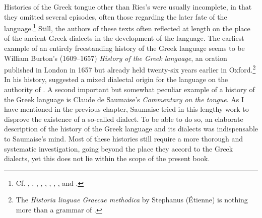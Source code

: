 Histories of the Greek tongue other than Ries’s were usually incomplete, in that they omitted several episodes, often those regarding the later fate of the language.\footnote{Cf. \citet[267--464]{Saumaise1643a}, \citet{Burton1657}, \citet{Lagerloof1685}, \citet{Rodigast1685}, \citet{Eling1691}, \citet{Florinus1707}, \citet{Reinhard1724}, \citet{Munthe1748}, and \citet{Harles1778}.} Still, the authors of these texts often reflected at length on the place of the ancient Greek dialects in the development of the language. The earliest example of an entirely freestanding history of the Greek language seems to be William Burton’s (1609–1657) \textit{History of the Greek language}, an oration published in London in 1657 but already held twenty-six years earlier in Oxford.\footnote{The \textit{Historia linguae Graecae methodica} by Stephanus (Étienne) \citet{Simon1615} is nothing more than a grammar of .} In his history, \citet[27]{Burton1657} suggested a mixed dialectal origin for the  language on the authority of . A second important but somewhat peculiar example of a history of the Greek language is Claude de Saumaise’s \textit{Commentary on the  tongue}. As I have mentioned in the previous chapter, Saumaise tried in this lengthy work to disprove the existence of a so-called  dialect. To be able to do so, an elaborate description of the history of the Greek language and its dialects was indispensable to Saumaise’s mind. Most of these histories still require a more thorough and systematic investigation, going beyond the place they accord to the Greek dialects, yet this does not lie within the scope of the present book.

